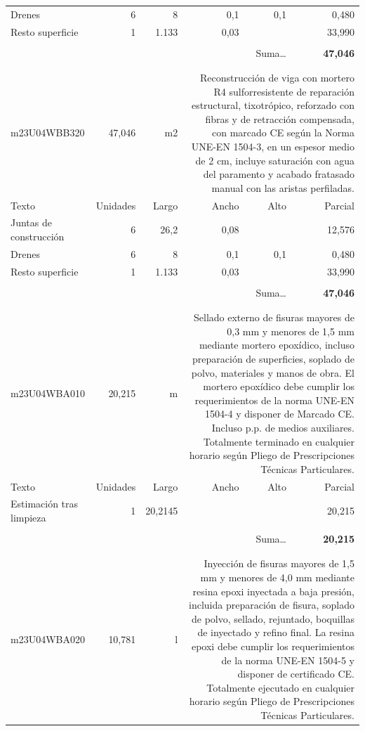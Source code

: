 \documentclass{book}%
\begin{document}
\begin{longtable}{lrrrrr}
\multicolumn{1}{p{3.5cm}}{Drenes}&6&8&0,1&0,1&     0,480\\%
\multicolumn{1}{p{3.5cm}}{Resto superficie}&1&1.133&0,03&&    33,990\\%
&&&&&\\%
\multicolumn{5}{r}{Suma\ldots}&\textbf{    47,046}\\%
\hline%
&&&&&\\%
&&&&&\\%
m23U04WBB320&    47,046& m2&\multicolumn{3}{p{6cm}}{\scriptsize Reconstrucción de viga con mortero R4 sulforresistente de reparación estructural, tixotrópico, reforzado con fibras y de retracción compensada, con marcado CE según la Norma UNE-EN 1504-3, en un espesor medio de 2 cm, incluye saturación con agua del paramento y acabado fratasado manual con las aristas perfiladas.\normalsize}\\%
Texto&Unidades&Largo&Ancho&Alto&Parcial\\%
\hline%
\multicolumn{1}{p{3.5cm}}{Juntas de construcción}&6&26,2&0,08&&    12,576\\%
\multicolumn{1}{p{3.5cm}}{Drenes}&6&8&0,1&0,1&     0,480\\%
\multicolumn{1}{p{3.5cm}}{Resto superficie}&1&1.133&0,03&&    33,990\\%
&&&&&\\%
\multicolumn{5}{r}{Suma\ldots}&\textbf{    47,046}\\%
\hline%
&&&&&\\%
&&&&&\\%
m23U04WBA010&    20,215& m&\multicolumn{3}{p{6cm}}{\scriptsize Sellado externo de fisuras mayores de 0,3 mm y menores de 1,5 mm mediante mortero epoxídico, incluso preparación de superficies, soplado de polvo, materiales y manos de obra. El mortero epoxídico debe cumplir los requerimientos de la norma UNE-EN 1504-4 y disponer de Marcado CE. Incluso p.p. de medios auxiliares. Totalmente terminado en cualquier horario según Pliego de Prescripciones Técnicas Particulares.\normalsize}\\%
Texto&Unidades&Largo&Ancho&Alto&Parcial\\%
\hline%
\multicolumn{1}{p{3.5cm}}{Estimación tras limpieza}&1&20,2145&&&    20,215\\%
&&&&&\\%
\multicolumn{5}{r}{Suma\ldots}&\textbf{    20,215}\\%
\hline%
&&&&&\\%
&&&&&\\%
m23U04WBA020&    10,781& l&\multicolumn{3}{p{6cm}}{\scriptsize Inyección de fisuras mayores de 1,5 mm y menores de 4,0 mm mediante resina epoxi inyectada a baja presión, incluida preparación de fisura, soplado de polvo, sellado, rejuntado, boquillas de inyectado y refino final. La resina epoxi debe cumplir los requerimientos de la norma UNE-EN 1504-5 y disponer de certificado CE. Totalmente ejecutado en cualquier horario según Pliego de Prescripciones Técnicas Particulares.\normalsize}\\%

\end{longtable}
\end{document}
